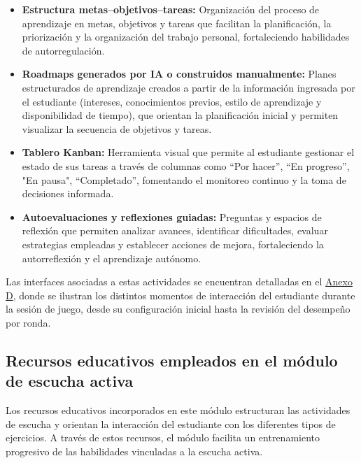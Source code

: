 \begin{itemize}

\item \textbf{Estructura metas–objetivos–tareas:} Organización del proceso de aprendizaje en metas, objetivos y tareas que facilitan la planificación, la priorización y la organización del trabajo personal, fortaleciendo habilidades de autorregulación.

\item \textbf{Roadmaps generados por IA o construidos manualmente:} Planes estructurados de aprendizaje creados a partir de la información ingresada por el estudiante (intereses, conocimientos previos, estilo de aprendizaje y disponibilidad de tiempo), que orientan la planificación inicial y permiten visualizar la secuencia de objetivos y tareas.

\item \textbf{Tablero Kanban:} Herramienta visual que permite al estudiante gestionar el estado de sus tareas a través de columnas como “Por hacer”, “En progreso”, "En pausa", “Completado”, fomentando el monitoreo continuo y la toma de decisiones informada.

\item \textbf{Autoevaluaciones y reflexiones guiadas:} Preguntas y espacios de reflexión que permiten analizar avances, identificar dificultades, evaluar estrategias empleadas y establecer acciones de mejora, fortaleciendo la autorreflexión y el aprendizaje autónomo.

\end{itemize}

\noindent Las interfaces asociadas a estas actividades se encuentran detalladas en el \hyperref[anexo:interfaces_escucha_activa]{Anexo D}, donde se ilustran los distintos momentos de interacción del estudiante durante la sesión de juego, desde su configuración inicial hasta la revisión del desempeño por ronda.



\subsection{Recursos educativos empleados en el módulo de escucha activa}
Los recursos educativos incorporados en este módulo estructuran las actividades de escucha y orientan la interacción del estudiante con los diferentes tipos de ejercicios. A través de estos recursos, el módulo facilita un entrenamiento progresivo de las habilidades vinculadas a la escucha activa.

